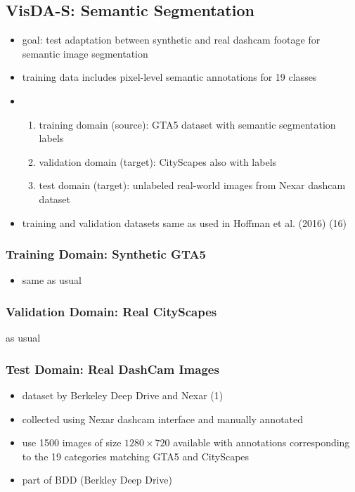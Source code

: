 \subsection{VisDA-S: Semantic Segmentation}
\begin{itemize}
	\item goal: test adaptation between synthetic and real dashcam footage for semantic image segmentation
	\item training data includes pixel-level semantic annotations for 19 classes
	\item \begin{enumerate}
		\item training domain (source): GTA5 dataset with semantic segmentation labels
		\item validation domain (target): CityScapes also with labels
		\item test domain (target): unlabeled real-world images from Nexar dashcam dataset
	\end{enumerate}
	\item training and validation datasets same as used in Hoffman et al. (2016) (16)
\end{itemize}
\subsubsection{Training Domain: Synthetic GTA5}
\begin{itemize}
	\item same as usual
\end{itemize}

\subsubsection{Validation Domain: Real CityScapes}
as usual

\subsubsection{Test Domain: Real DashCam Images}
\begin{itemize}
	\item dataset by Berkeley Deep Drive and Nexar (1)
	\item collected using Nexar dashcam interface and manually annotated
	\item use 1500 images of size $1280 \times 720$ available with annotations corresponding to the 19 categories matching GTA5 and CityScapes
	\item part of BDD (Berkley Deep Drive)
\end{itemize}

